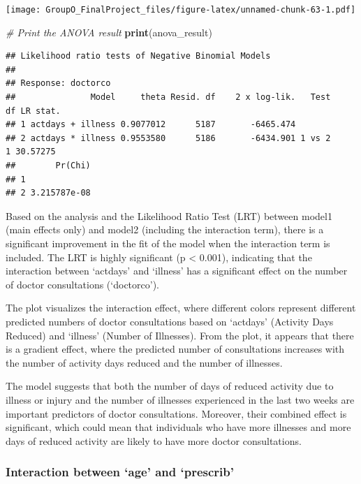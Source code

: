 \documentclass[
]{article}
\newenvironment{Shaded}{\begin{snugshade}}{\end{snugshade}}
\newcommand{\CommentTok}[1]{\textcolor[rgb]{0.56,0.35,0.01}{\textit{#1}}}
\newcommand{\FunctionTok}[1]{\textcolor[rgb]{0.13,0.29,0.53}{\textbf{#1}}}
\newcommand{\NormalTok}[1]{#1}
\begin{document}
\texttt{[image: GroupO\_FinalProject\_files/figure-latex/unnamed-chunk-63-1.pdf]}

\begin{Shaded}
\begin{Highlighting}[]
\CommentTok{\# Print the ANOVA result}
\FunctionTok{print}\NormalTok{(anova\_result)}
\end{Highlighting}
\end{Shaded}

\begin{verbatim}
## Likelihood ratio tests of Negative Binomial Models
## 
## Response: doctorco
##               Model     theta Resid. df    2 x log-lik.   Test    df LR stat.
## 1 actdays + illness 0.9077012      5187       -6465.474                      
## 2 actdays * illness 0.9553580      5186       -6434.901 1 vs 2     1 30.57275
##        Pr(Chi)
## 1             
## 2 3.215787e-08
\end{verbatim}

Based on the analysis and the Likelihood Ratio Test (LRT) between model1
(main effects only) and model2 (including the interaction term), there
is a significant improvement in the fit of the model when the
interaction term is included. The LRT is highly significant (p
\textless{} 0.001), indicating that the interaction between `actdays'
and `illness' has a significant effect on the number of doctor
consultations (`doctorco').

The plot visualizes the interaction effect, where different colors
represent different predicted numbers of doctor consultations based on
`actdays' (Activity Days Reduced) and `illness' (Number of Illnesses).
From the plot, it appears that there is a gradient effect, where the
predicted number of consultations increases with the number of activity
days reduced and the number of illnesses.

The model suggests that both the number of days of reduced activity due
to illness or injury and the number of illnesses experienced in the last
two weeks are important predictors of doctor consultations. Moreover,
their combined effect is significant, which could mean that individuals
who have more illnesses and more days of reduced activity are likely to
have more doctor consultations.

\subsubsection{Interaction between `age' and
`prescrib'}\label{interaction-between-age-and-prescrib}
\end{document}
